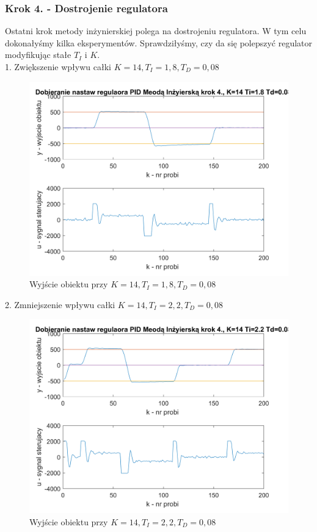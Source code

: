 \documentclass[a4paper, 10pt]{article}
\begin{document}
\subsubsection{Krok 4. - Dostrojenie regulatora}
Ostatni krok metody inżynierskiej polega na dostrojeniu regulatora. W tym celu dokonałyśmy kilka eksperymentów. Sprawdziłyśmy, czy da się polepszyć regulator modyfikując stałe $T_{I}$ i $K$.\\

1. Zwiększenie wpływu całki $K=14,  T_{I}=1,8,  T_{D}=0,08 $ 
\begin{figure}[H]
	\centering
	\includegraphics[width=0.9\linewidth]{MI_11}
	\caption{Wyjście obiektu przy $K=14, T_{I}=1,8, T_{D}=0,08 $  }
	\label{fig:MI_11}
\end{figure}
2. Zmniejszenie wpływu całki $K=14, T_{I}=2,2, T_{D}=0,08 $ 
\begin{figure}[H]
	\centering
	\includegraphics[width=0.9\linewidth]{MI_33}
	\caption{Wyjście obiektu przy $K=14, T_{I}=2,2, T_{D}=0,08 $  }
	\label{fig:MI_33}
\end{figure}
\end{document}
